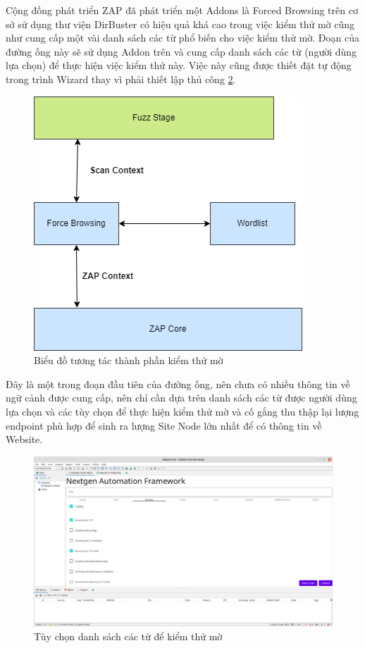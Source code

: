 \documentclass[./../main.tex]{subfiles}
\begin{document}
Cộng đồng phát triển ZAP đã phát triển một Addons là Forced Browsing trên
cơ sở sử dụng thư viện DirBuster có hiệu quả khá cao trong việc kiểm thử mờ
cũng như cung cấp một vài danh sách các từ phổ biến cho việc kiểm thử mờ.
Đoạn của đường ống này sẽ sử dụng Addon trên và cung cấp danh sách các từ
(người dùng lựa chọn) để thực hiện việc kiểm thử này. Việc này cũng được
thiết đặt tự động trong trình Wizard thay vì phải thiết lập thủ công \ref{fig:fuzz}.

\begin{figure}[ht!]
	\includegraphics[width=\linewidth]{./images/fuzz_stage.png}
	\caption{Biểu đồ tương tác thành phần kiểm thử mờ}
	\label{fig:fuzz_stage}
\end{figure}

Đây là một trong đoạn đầu tiên của đường ống, nên chưa có nhiều thông tin
về ngữ cảnh được cung cấp, nên chỉ cần dựa trên danh sách các từ được người
dùng  lựa chọn và các tùy chọn để thực hiện kiểm thử mờ và cố gắng thu thập
lại lượng endpoint phù hợp để sinh ra lượng Site Node lớn nhất để có
thông tin về Website.

\begin{figure}[ht!]
	\includegraphics[width=\linewidth]{./images/fuzz.png}
	\caption{Tùy chọn danh sách các từ để kiểm thử mờ}
	\label{fig:fuzz}
\end{figure}
\end{document}
